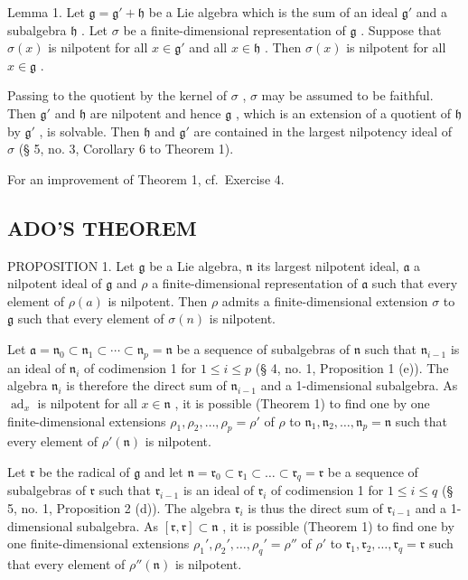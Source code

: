 Lemma 1. Let \(\mathfrak{g} = \mathfrak{g}' + \mathfrak{h}\) be a Lie algebra which is the sum of an ideal \(\mathfrak{g}'\) and a subalgebra \(\mathfrak{h}\) . Let \(\sigma\) be a finite-dimensional representation of \(\mathfrak{g}\) . Suppose that \(\sigma(x)\) is nilpotent for all \(x \in \mathfrak{g}'\) and all \(x \in \mathfrak{h}\) . Then \(\sigma(x)\) is nilpotent for all \(x \in \mathfrak{g}\) .

Passing to the quotient by the kernel of \(\sigma\) , \(\sigma\) may be assumed to be faithful. Then \(\mathfrak{g}'\) and \(\mathfrak{h}\) are nilpotent and hence \(\mathfrak{g}\) , which is an extension of a quotient of \(\mathfrak{h}\) by \(\mathfrak{g}'\) , is solvable. Then \(\mathfrak{h}\) and \(\mathfrak{g}'\) are contained in the largest nilpotency ideal of \(\sigma\) (§ 5, no. 3, Corollary 6 to Theorem 1).

For an improvement of Theorem 1, cf.~Exercise 4.

\subsection{ADO'S THEOREM}

PROPOSITION 1. Let \(\mathfrak{g}\) be a Lie algebra, \(\mathfrak{n}\) its largest nilpotent ideal, \(\mathfrak{a}\) a nilpotent ideal of \(\mathfrak{g}\) and \(\rho\) a finite-dimensional representation of \(\mathfrak{a}\) such that every element of \(\rho(a)\) is nilpotent. Then \(\rho\) admits a finite-dimensional extension \(\sigma\) to \(\mathfrak{g}\) such that every element of \(\sigma(n)\) is nilpotent.

Let \(\mathfrak{a} = \mathfrak{n}_0 \subset \mathfrak{n}_1 \subset \cdots \subset \mathfrak{n}_p = \mathfrak{n}\) be a sequence of subalgebras of \(\mathfrak{n}\) such that \(\mathfrak{n}_{i-1}\) is an ideal of \(\mathfrak{n}_i\) of codimension 1 for \(1 \leqslant i \leqslant p\) (§ 4, no. 1, Proposition 1 (e)). The algebra \(\mathfrak{n}_i\) is therefore the direct sum of \(\mathfrak{n}_{i-1}\) and a 1-dimensional subalgebra. As \(\operatorname{ad}_x\) is nilpotent for all \(x \in \mathfrak{n}\) , it is possible (Theorem 1) to find one by one finite-dimensional extensions \(\rho_1, \rho_2, \ldots, \rho_p = \rho'\) of \(\rho\) to \(\mathfrak{n}_1, \mathfrak{n}_2, \ldots, \mathfrak{n}_p = \mathfrak{n}\) such that every element of \(\rho'(\mathfrak{n})\) is nilpotent.

Let \(\mathfrak{r}\) be the radical of \(\mathfrak{g}\) and let \(\mathfrak{n} = \mathfrak{r}_0 \subset \mathfrak{r}_1 \subset \dots \subset \mathfrak{r}_q = \mathfrak{r}\) be a sequence of subalgebras of \(\mathfrak{r}\) such that \(\mathfrak{r}_{i-1}\) is an ideal of \(\mathfrak{r}_i\) of codimension 1 for \(1 \leqslant i \leqslant q\) (§ 5, no. 1, Proposition 2 (d)). The algebra \(\mathfrak{r}_i\) is thus the direct sum of \(\mathfrak{r}_{i-1}\) and a 1-dimensional subalgebra. As \([\mathfrak{r}, \mathfrak{r}] \subset \mathfrak{n}\) , it is possible (Theorem 1) to find one by one finite-dimensional extensions \(\rho_1', \rho_2', \ldots, \rho_q' = \rho''\) of \(\rho'\) to \(\mathfrak{r}_1, \mathfrak{r}_2, \ldots, \mathfrak{r}_q = \mathfrak{r}\) such that every element of \(\rho''(\mathfrak{n})\) is nilpotent.


